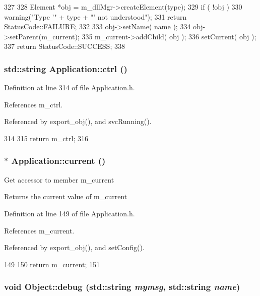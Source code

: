 \begin{DoxyCode}
327 {
328   Element *obj = m_dllMgr->createElement(type);
329   if ( !obj ) {
330     warning("Type '" + type + "'  not understood");
331     return StatusCode::FAILURE;
332   }
333   obj->setName( name );
334   obj->setParent(m_current);
335   m_current->addChild( obj );
336   setCurrent( obj );
337   return StatusCode::SUCCESS;
338 }
\end{DoxyCode}
\hypertarget{classApplication_a3eb11c9a1985a3a9d2ec51df957f7c2f}{
\subsubsection[{ctrl}]{\setlength{\rightskip}{0pt plus 5cm}std::string Application::ctrl ()}}
\label{classApplication_a3eb11c9a1985a3a9d2ec51df957f7c2f}


Definition at line 314 of file Application.h.

References m\_\-ctrl.

Referenced by export\_\-obj(), and svcRunning().


\begin{DoxyCode}
314                    {
315     return m_ctrl;
316   }
\end{DoxyCode}
\hypertarget{classApplication_af25c880ff1e95d863ed058396754a76e}{
\subsubsection[{current}]{$\ast$ Application::current ()}}
\label{classApplication_af25c880ff1e95d863ed058396754a76e}
Get accessor to member m\_\-current \begin{DoxyReturn}{Returns}
the current value of m\_\-current 
\end{DoxyReturn}


Definition at line 149 of file Application.h.

References m\_\-current.

Referenced by export\_\-obj(), and setConfig().


\begin{DoxyCode}
149                         {
150     return m_current;
151   }
\end{DoxyCode}
\hypertarget{classObject_a6c9a0397ca804e04d675ed05683f5420}{
\subsubsection[{debug}]{\setlength{\rightskip}{0pt plus 5cm}void Object::debug (std::string {\em mymsg}, \/  std::string {\em name})}}
\label{classObject_a6c9a0397ca804e04d675ed05683f5420}


